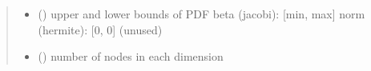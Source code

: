 \documentclass[letterpaper,10pt,english,openany,oneside]{sphinxmanual}
\begin{document}
\begin{fulllineitems}
\begin{quote}
\begin{description}
\begin{itemize}
\item {} 
 (\sphinxstyleliteralemphasis{\sphinxupquote{{[}}}\sphinxstyleliteralemphasis{\sphinxupquote{{]} }}) \textendash{} upper and lower bounds of PDF
beta (jacobi):  {[}min, max{]}
norm (hermite): {[}0, 0{]} (unused)

\item {} 
 (\sphinxstyleliteralemphasis{\sphinxupquote{{[}}}\sphinxstyleliteralemphasis{\sphinxupquote{{]} }}) \textendash{} number of nodes in each dimension

\end{itemize}

\end{description}\end{quote}

\end{fulllineitems}

\end{document}
